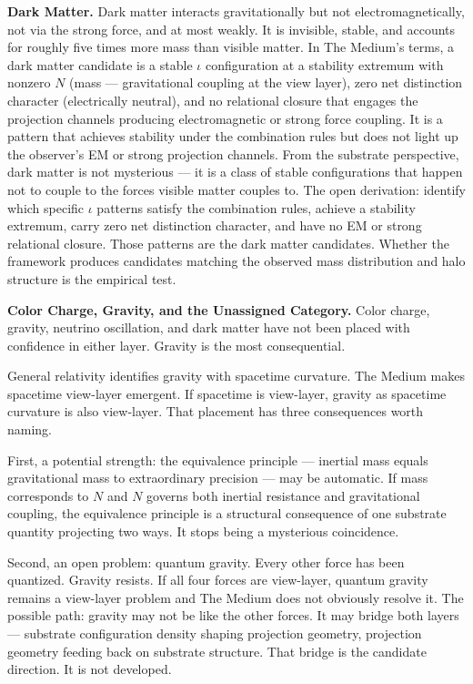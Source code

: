 \documentclass[11pt,letterpaper]{article}
\begin{document}
\textbf{Dark Matter.} Dark matter interacts gravitationally but not electromagnetically, not via the strong force, and at most weakly. It is invisible, stable, and accounts for roughly five times more mass than visible matter. In The Medium's terms, a dark matter candidate is a stable \(\iota\) configuration at a stability extremum with nonzero \(N\) (mass --- gravitational coupling at the view layer), zero net distinction character (electrically neutral), and no relational closure that engages the projection channels producing electromagnetic or strong force coupling. It is a pattern that achieves stability under the combination rules but does not light up the observer's EM or strong projection channels. From the substrate perspective, dark matter is not mysterious --- it is a class of stable configurations that happen not to couple to the forces visible matter couples to. The open derivation: identify which specific \(\iota\) patterns satisfy the combination rules, achieve a stability extremum, carry zero net distinction character, and have no EM or strong relational closure. Those patterns are the dark matter candidates. Whether the framework produces candidates matching the observed mass distribution and halo structure is the empirical test.

\textbf{Color Charge, Gravity, and the Unassigned Category.} Color charge, gravity, neutrino oscillation, and dark matter have not been placed with confidence in either layer. Gravity is the most consequential.

General relativity identifies gravity with spacetime curvature. The Medium makes spacetime view-layer emergent. If spacetime is view-layer, gravity as spacetime curvature is also view-layer. That placement has three consequences worth naming.

First, a potential strength: the equivalence principle --- inertial mass equals gravitational mass to extraordinary precision --- may be automatic. If mass corresponds to \(N\) and \(N\) governs both inertial resistance and gravitational coupling, the equivalence principle is a structural consequence of one substrate quantity projecting two ways. It stops being a mysterious coincidence.

Second, an open problem: quantum gravity. Every other force has been quantized. Gravity resists. If all four forces are view-layer, quantum gravity remains a view-layer problem and The Medium does not obviously resolve it. The possible path: gravity may not be like the other forces. It may bridge both layers --- substrate configuration density shaping projection geometry, projection geometry feeding back on substrate structure. That bridge is the candidate direction. It is not developed.
\end{document}
